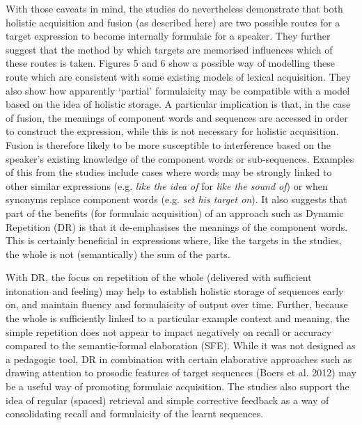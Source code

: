 \documentclass[12pt]{article}
\newenvironment{styleStandard}{\setlength\leftskip{0cm}\setlength\rightskip{0cm plus 1fil}\setlength\parindent{0cm}\setlength\parfillskip{0pt plus 1fil}\setlength\parskip{0in plus 1pt}\writerlistparindent\writerlistleftskip\leavevmode\normalfont\normalsize\writerlistlabel\ignorespaces}{\unskip\vspace{0.111in plus 0.0111in}\par}
\newcommand\writerlistleftskip{}
\newcommand\writerlistparindent{}
\newcommand\writerlistlabel{}
\begin{document}
\begin{styleStandard}
With those caveats in mind, the studies do nevertheless demonstrate that both holistic acquisition and fusion (as described here) are two possible routes for a target expression to become internally formulaic for a speaker. They further suggest that the method by which targets are memorised influences which of these routes is taken. Figures 5 and 6 show a possible way of modelling these route which are consistent with some existing models of lexical acquisition. They also show how apparently ‘partial’ formulaicity may be compatible with a model based on the idea of holistic storage. A particular implication is that, in the case of fusion, the meanings of component words and sequences are accessed in order to construct the expression, while this is not necessary for holistic acquisition. Fusion is therefore likely to be more susceptible to interference based on the speaker’s existing knowledge of the component words or sub-sequences. Examples of this from the studies include cases where words may be strongly linked to other similar expressions (e.g. \textit{like the idea of} for \textit{like the sound of}) or when synonyms replace component words (e.g. \textit{set his target on}). It also suggests that part of the benefits (for formulaic acquisition) of an approach such as Dynamic Repetition (DR) is that it de-emphasises the meanings of the component words. This is certainly beneficial in expressions where, like the targets in the studies, the whole is not (semantically) the sum of the parts. 
\end{styleStandard}

\begin{styleStandard}
With DR, the focus on repetition of the whole (delivered with sufficient intonation and feeling) may help to establish holistic storage of sequences early on, and maintain fluency and formulaicity of output over time. Further, because the whole is sufficiently linked to a particular example context and meaning, the simple repetition does not appear to impact negatively on recall or accuracy compared to the semantic-formal elaboration (SFE). While it was not designed as a pedagogic tool, DR in combination with certain elaborative approaches such as drawing attention to prosodic features of target sequences (Boers et al. 2012) may be a useful way of promoting formulaic acquisition. The studies also support the idea of regular (spaced) retrieval and simple corrective feedback as a way of consolidating recall and formulaicity of the learnt sequences.
\end{styleStandard}
\end{document}

